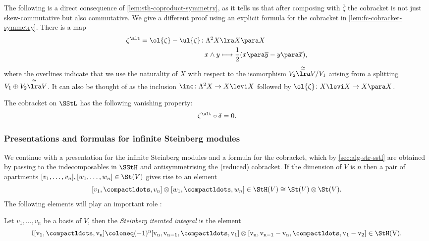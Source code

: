 \documentclass[a4paper]{amsart}
\begin{document}
\medskip

The following is a direct consequence of \cref{lem:sth-coproduct-symmetry}, as it tells us that after composing with $\overline{\zeta}$ the cobracket is not just skew-commutative but also commutative. We give a different proof using an explicit formula for the cobracket in \cref{lem:fc-cobracket-symmetry}. There is a map
\begin{equation}\label{eqn:zeta-alt}\begin{aligned}\zeta^\alt = \ol{\zeta}-\ul{\zeta} \colon \Lambda^2 X &\lra X \para X \\
x \wedge y &\longmapsto \frac{1}{2}(x \para \overline{y} - y \para \overline{x}),\end{aligned}\end{equation}
where the overlines indicate that we use the naturality of $X$ with respect to the isomorphism $V_2 \overset{\cong}\lra V/V_1$ arising from a splitting $V_1 \oplus V_2 \overset{\cong}\lra V$. It can also be thought of as the inclusion $\inc \colon \Lambda^2 X \to X \levi X$ followed by $\ol{\zeta} \colon X \levi X \to X \para X$.

\begin{lemma}\label{lem:stl-cobracket-vanishing} The cobracket on $\SStL$ has the following vanishing property: 
\[\zeta^\alt \circ \delta = 0.\]
\end{lemma}

\subsubsection{Presentations and formulas for infinite Steinberg modules}\label{sec:pres-form-stl} We continue with a presentation for the infinite Steinberg modules and a formula for the cobracket, which by \cref{sec:alg-str-sstl} are obtained by passing to the indecomposables in $\SStH$ and antisymmetrising the (reduced) cobracket. If the dimension of $V$ is $n$ then a pair of apartments $[v_1,\ldots,v_n],[w_1,\ldots,w_n] \in \St(V)$ gives rise to an element
\[[v_1,\compactldots,v_n] \otimes [w_1,\compactldots,w_n] \in \StH(V) \cong \St(V) \otimes \St(V).\]
The following elements will play an important role \cite[Definition 28]{CharltonRadchenkoRudenko}:

\begin{definition}\label{def:steinberg-iterated-integral} Let $v_1,\ldots,v_n$ be a basis of $V$, then the \emph{Steinberg iterated integral} is the element
\[\rm{I}[v_1,\compactldots,v_n] \coloneq (-1)^n [v_n,v_{n-1},\compactldots,v_1] \otimes [v_n,v_{n-1}-v_n,\compactldots,v_1-v_2] \in \StH(V).\]
\end{definition}
\end{document}
